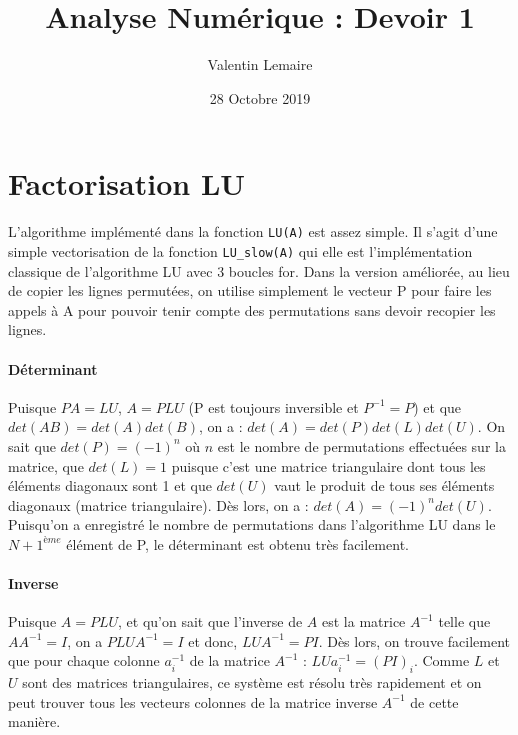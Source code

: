 \documentclass[11pt]{article}
\title{Analyse Numérique : Devoir 1}
\author{Valentin Lemaire}
\date{28 Octobre 2019}
\begin{document}

\section{Factorisation LU}
\vspace{-8pt}
L'algorithme implémenté dans la fonction \texttt{LU(A)} est assez simple. Il s'agit d'une simple vectorisation de la fonction \texttt{LU\_slow(A)} qui elle est l'implémentation classique de l'algorithme LU avec 3 boucles for. Dans la version améliorée, au lieu de copier les lignes permutées, on utilise simplement le vecteur P pour faire les appels à A pour pouvoir tenir compte des permutations sans devoir recopier les lignes. 
\vspace{-5pt}
\paragraph{Déterminant} Puisque $PA = LU$, $A = PLU$ (P est toujours inversible et $P^{-1} = P$) et que $det(AB) = det(A)det(B)$, on a : $det(A) = det(P)det(L)det(U)$. On sait que $det(P) = (-1)^n$ où $n$ est le nombre de permutations effectuées sur la matrice, que $det(L) = 1$ puisque c'est une matrice triangulaire dont tous les éléments diagonaux sont 1 et que $det(U)$ vaut le produit de tous ses éléments diagonaux (matrice triangulaire). Dès lors, on a : $det(A) = (-1)^n det(U)$. Puisqu'on a enregistré le nombre de permutations dans l'algorithme LU dans le $N+1^{ème}$ élément de P, le déterminant est obtenu très facilement.  
\vspace{-5pt}
\paragraph{Inverse} Puisque $A = PLU$, et qu'on sait que l'inverse de $A$ est la matrice $A^{-1}$ telle que $AA^{-1} = I$, on a $PLU A^{-1} = I$ et donc, $LU A^{-1} = PI$. Dès lors, on trouve facilement que pour chaque colonne $a^{-1}_i$ de la matrice $A^{-1}$ : $LU a^{-1}_i = (PI)_i$. Comme $L$ et $U$ sont des matrices triangulaires, ce système est résolu très rapidement et on peut trouver tous les vecteurs colonnes de la matrice inverse $A^{-1}$ de cette manière.
\vspace{-5pt}
\end{document}
